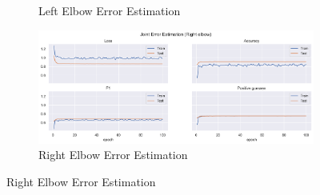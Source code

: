 \begin{figure}[!ht]
\begin{subfigure}[b]{0.47\linewidth}
        \caption{Left Elbow Error Estimation}
        \label{fig:v2_leel_jt_ee}
    \end{subfigure}
    \hfill
    \begin{subfigure}[b]{0.47\linewidth}
        \centering
        \includegraphics[width=\textwidth]{figures/Results/v2_bs_40_is_64_e_100/jt/Right elbow_ErrorEstimation.png}
        \caption{Right Elbow Error Estimation}
        \label{fig:v2_reel_jt_ee}
    \end{subfigure}
  \end{figure}
  
